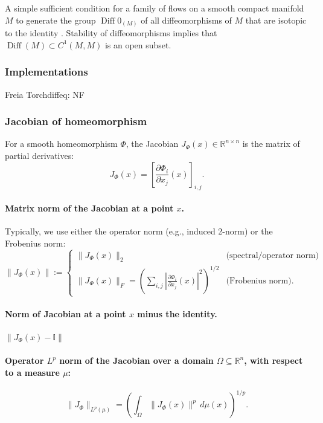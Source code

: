 \documentclass{article}
\theoremstyle{definition} \newtheorem{definition}{Definition}  \newtheorem{example}{Example}
\theoremstyle{remark} \newtheorem{remark}{Remark}
\newcounter{ct}
\newcommand{\Diff}{\operatorname{Diff}}
\begin{document}
A simple sufficient condition for a family of flows on a smooth compact manifold $M$ to generate the group $\Diff0_(M)$ of all diffeomorphisms of $M$ that are isotopic to the identity \citep{caponigro2010families}.
%
Stability of diffeomorphisms implies that $\Diff(M)\subset C^1(M,M)$  is an open subset.


\subsubsection{Implementations}
Freia\citep{freia} %
Torchdiffeq: \citep{torchdiffeq}
NF\citep{dinh2016density} %
\citep{stimper2023normflows} %



\subsubsection{Jacobian of homeomorphism}\label{eq:jacobian_norm}
 For a smooth homeomorphism \( \Phi \), the Jacobian \( J_{\Phi}(x) \in \mathbb{R}^{n \times n} \) is the matrix of partial derivatives:
\[
J_{\Phi}(x) = \left[ \frac{\partial \Phi_i}{\partial x_j}(x) \right]_{i,j}.
\]

\paragraph{Matrix norm of the Jacobian at a point \( x \).} Typically, we use either the operator norm (e.g., induced 2-norm) or the Frobenius norm:
\[
\|J_{\Phi}(x)\| :=
\begin{cases}
\|J_{\Phi}(x)\|_2 & \text{(spectral/operator norm)} \\
\|J_{\Phi}(x)\|_F = \left( \sum_{i,j} \left| \frac{\partial \Phi_i}{\partial x_j}(x) \right|^2 \right)^{1/2} & \text{(Frobenius norm)}.
\end{cases}
\]

\paragraph{Norm of Jacobian at a point \( x \) minus the identity.}
\(\|J_{\Phi}(x) - \mathbb{I}\| \)

\paragraph{Operator \( L^p \) norm of the Jacobian over a domain \( \Omega \subseteq \mathbb{R}^n \), with respect to a measure \( \mu \):}
\[
\|J_{\Phi}\|_{L^p(\mu)} = \left( \int_{\Omega} \|J_{\Phi}(x)\|^p \, d\mu(x) \right)^{1/p}.
\]
\end{document}
